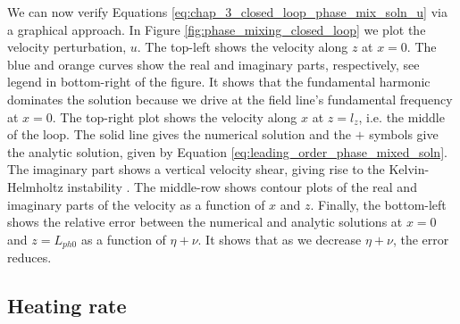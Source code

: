 We can now verify Equations \eqref{eq:chap_3_closed_loop_phase_mix_soln_u} via a graphical approach. In Figure \ref{fig:phase_mixing_closed_loop} we plot the velocity perturbation, $u$. The top-left shows the velocity along $z$ at $x=0$. The blue and orange curves show the real and imaginary parts, respectively, see legend in bottom-right of the figure. It shows that the fundamental harmonic dominates the solution because we drive at the field line's fundamental frequency at $x=0$. The top-right plot shows the velocity along $x$ at $z=l_z$, i.e. the middle of the loop. The solid line gives the numerical solution and the $+$ symbols give the analytic solution, given by Equation \eqref{eq:leading_order_phase_mixed_soln}. The imaginary part shows a vertical velocity shear, giving rise to the Kelvin-Helmholtz instability \citep{Heyvaerts1983}. The middle-row shows contour plots of the real and imaginary parts of the velocity as a function of $x$ and $z$. Finally, the bottom-left shows the relative error between the numerical and analytic solutions at $x=0$ and $z=L_{ph0}$ as a function of $\eta+\nu$. It shows that as we decrease $\eta+\nu$, the error reduces.
 
\subsection{Heating rate}
\label{sec:chap_3_closed_loop_heating_rate}
 
